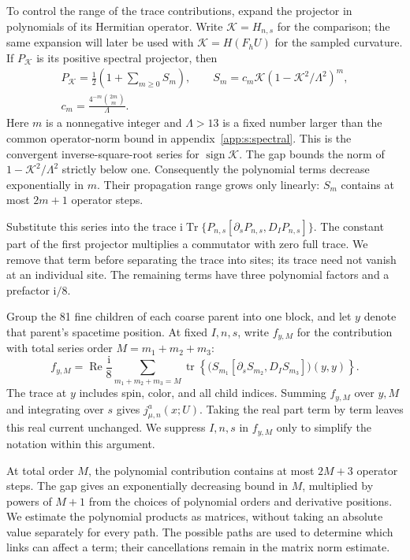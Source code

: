 \documentclass[11pt,a4paper]{article}
\theoremstyle{remark}
\DeclareMathOperator{\Tr}{Tr}
\DeclareMathOperator{\tr}{tr}
\newcommand{\ii}{\mathrm i}
\begin{document}
To control the range of the trace contributions, expand the projector
in polynomials of its Hermitian operator. Write $\mathcal K=H_{n,s}$
for the comparison; the same expansion will later be used with
$\mathcal K=H(F_hU)$ for the sampled curvature. If $P_{\mathcal K}$
is its positive spectral projector, then
\begin{equation}
 \begin{gathered}
 P_{\mathcal K}=\frac12\left(1+\sum_{m\ge0}S_m\right),
 \qquad S_m=c_m\mathcal K(1-\mathcal K^2/\Lambda^2)^m,\\
 c_m=\frac{4^{-m}\binom{2m}{m}}{\Lambda}.
 \end{gathered}
 \label{eq:local-polynomial-projector}
\end{equation}
Here $m$ is a nonnegative integer and $\Lambda>13$ is a fixed number
larger than the common operator-norm bound in
appendix~\ref{app:s:spectral}. This is the convergent
inverse-square-root series for $\operatorname{sign}\mathcal K$.
The gap bounds the norm of $1-\mathcal K^2/\Lambda^2$ strictly below
one. Consequently the polynomial terms decrease exponentially in $m$.
Their propagation range grows only linearly: $S_m$ contains at most
$2m+1$ operator steps.

Substitute this series into the trace
$\ii\Tr\{P_{n,s}[\partial_sP_{n,s},D_IP_{n,s}]\}$.
The constant part of the first projector multiplies a commutator with
zero full trace. We remove that term before separating the trace into
sites; its trace need not vanish at an individual site. The remaining
terms have three polynomial factors and a prefactor $\ii/8$.

Group the 81 fine children of each coarse parent into one block, and let
$y$ denote that parent's spacetime position. At fixed $I,n,s$, write
$f_{y,M}$ for the contribution with total series order
$M=m_1+m_2+m_3$:
\begin{equation}
 f_{y,M}
 =\operatorname{Re}\frac{\ii}{8}
   \sum_{m_1+m_2+m_3=M}
   \tr\!\left\{
       \bigl(S_{m_1}[\partial_sS_{m_2},D_IS_{m_3}]\bigr)(y,y)
             \right\}.
 \label{eq:local-trace-example}
\end{equation}
The trace at $y$ includes spin, color, and all child indices. Summing
$f_{y,M}$ over $y,M$ and integrating over $s$ gives
$j_{\mu,n}^a(x;U)$. Taking the real part term by term leaves this real
current unchanged. We suppress $I,n,s$ in $f_{y,M}$ only to simplify
the notation within this argument.

At total order $M$, the polynomial contribution contains at most
$2M+3$ operator steps. The gap gives an exponentially decreasing bound
in $M$, multiplied by powers of $M+1$ from the choices of polynomial
orders and derivative positions. We estimate the polynomial products as
matrices, without taking an absolute value separately for every path.
The possible paths are used to determine which links can affect a term;
their cancellations remain in the matrix norm estimate.
\end{document}
